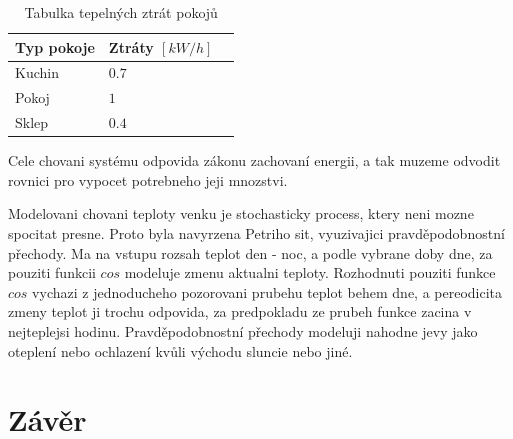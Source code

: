 \begin{table}[H]
	\vskip6pt
	\caption{Tabulka tepelných ztrát pokojů} 
    \vskip6pt
	\centering
	\begin{tabular}{llr}
		\toprule
		Typ pokoje & Ztráty $[kW/h]$ \\
		\midrule
		Kuchin & $0.7$ \\
    Pokoj & $1$ \\
    Sklep & $0.4$ \\
		\bottomrule
	\end{tabular}
	\label{tab:TepelneZtraty}
\end{table}

Cele chovani systému odpovida zákonu zachovaní energii, a tak muzeme odvodit rovnici pro vypocet potrebneho jeji mnozstvi.


Modelovani chovani teploty venku je stochasticky process, ktery neni mozne spocitat presne. Proto byla navyrzena Petriho sit, vyuzivajici pravděpodobnostní přechody. Ma na vstupu rozsah teplot den - noc, a podle vybrane doby dne, za pouziti funkcii $cos$ modeluje zmenu aktualni teploty. Rozhodnuti pouziti funkce $cos$ vychazi z jednoducheho pozorovani prubehu teplot behem dne, a pereodicita zmeny teplot ji trochu odpovida, za predpokladu ze prubeh funkce zacina v nejteplejsi hodinu. %
Pravděpodobnostní přechody modeluji nahodne jevy jako oteplení nebo ochlazení kvůli východu sluncie nebo jiné.


\chapter{Závěr}
\label{zaver}
